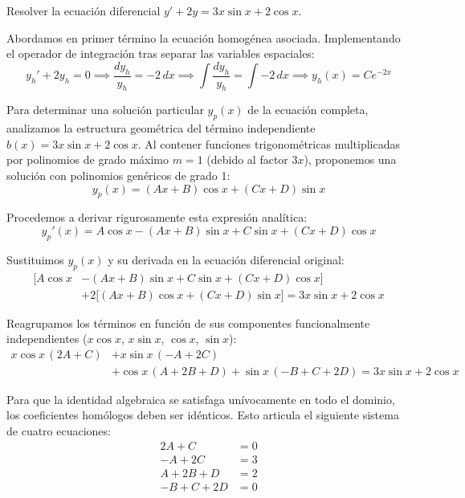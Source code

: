\begin{ejercicio}
Resolver la ecuación diferencial $y' + 2y = 3x \sin x + 2\cos x$.
\end{ejercicio}

\begin{tcolorbox}
Abordamos en primer término la ecuación homogénea asociada. Implementando el operador de integración tras separar las variables espaciales:
$$ y_h' + 2y_h = 0 \implies \frac{dy_h}{y_h} = -2\,dx \implies \int \frac{dy_h}{y_h} = \int -2\,dx \implies y_h(x) = C e^{-2x} $$

Para determinar una solución particular $y_p(x)$ de la ecuación completa, analizamos la estructura geométrica del término independiente $b(x) = 3x \sin x + 2\cos x$. Al contener funciones trigonométricas multiplicadas por polinomios de grado máximo $m=1$ (debido al factor $3x$), proponemos una solución con polinomios genéricos de grado 1:
$$ y_p(x) = (Ax + B)\cos x + (Cx + D)\sin x $$

Procedemos a derivar rigurosamente esta expresión analítica:
$$ y_p'(x) = A\cos x - (Ax + B)\sin x + C\sin x + (Cx + D)\cos x $$

Sustituimos $y_p(x)$ y su derivada en la ecuación diferencial original:
\begin{align*}
    \big[ A\cos x &- (Ax + B)\sin x + C\sin x + (Cx + D)\cos x \big] \\
    &+ 2\big[ (Ax + B)\cos x + (Cx + D)\sin x \big] = 3x \sin x + 2\cos x
\end{align*}

Reagrupamos los términos en función de sus componentes funcionalmente independientes ($x\cos x$, $x\sin x$, $\cos x$, $\sin x$):
\begin{align*}
    x\cos x \, (2A + C) &+ x\sin x \, (-A + 2C) \\
    &+ \cos x \, (A + 2B + D) + \sin x \, (-B + C + 2D) = 3x \sin x + 2\cos x
\end{align*}

Para que la identidad algebraica se satisfaga unívocamente en todo el dominio, los coeficientes homólogos deben ser idénticos. Esto articula el siguiente sistema de cuatro ecuaciones:
\begin{align*}
    2A + C &= 0 \\
    -A + 2C &= 3 \\
    A + 2B + D &= 2 \\
    -B + C + 2D &= 0
\end{align*}


\end{tcolorbox}
